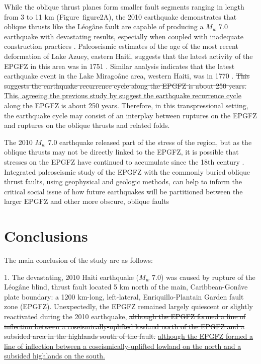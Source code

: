 \documentclass[linenumbers,draft]{agujournal}
\providecommand{\DIFadd}[1]{{\protect\color{blue}\uwave{#1}}} %
\providecommand{\DIFdel}[1]{{\protect\color{red}\sout{#1}}}                      %
\providecommand{\DIFaddbegin}{} %
\providecommand{\DIFaddend}{} %
\providecommand{\DIFdelbegin}{} %
\providecommand{\DIFdelend}{} %
\begin{document}
While the oblique thrust planes form smaller fault segments ranging in length from 3 to 11 km (Figure~{figure2}A), the 2010 earthquake demonstrates that oblique thrusts like the L\'eog\^ane fault are capable of producing a $M_w$ 7.0 earthquake with devastating results, especially when coupled with inadequate construction practices \citep{symithe2016present}. Paleoseismic estimates of the age of the most recent deformation of Lake Azuey, eastern Haiti, suggests that the latest activity of the EPGFZ in this area was in 1751 \citep{prentice2010seismic,bakun2012significant}. Similar analysis indicates that the latest earthquake event in the Lake Mirago\^ane area, western Haiti, was in 1770 \citep{bakun2012significant}. \DIFdelbegin \DIFdel{This suggests the earthquake recurrence cycle along the EPGFZ is about 250 years. }\DIFdelend \DIFaddbegin \ul{This, agreeing the previous study by }\underline{\DIFadd{\mbox{%
\citet{bakun2012significant}}\hspace{0pt}%
,}}\ul{ suggest the earthquake recurrence cycle along the EPGFZ is about 250 years.} \DIFaddend Therefore, in this transpressional setting, the earthquake cycle may consist of an interplay between ruptures on the EPGFZ and ruptures on the oblique thrusts and related folds. 

The 2010 $M_w$ 7.0 earthquake released part of the stress of the region, but as the oblique thrusts may not be directly linked to the EPGFZ, it is possible that stresses on the EPGFZ have continued to accumulate since the 18th century \citep{prentice2010seismic}. Integrated paleoseismic study of the EPGFZ with the commonly buried oblique thrust faults, using geophysical and geologic methods, can help to inform the critical social issue of how future earthquakes will be partitioned between the larger EPGFZ and other more obscure, oblique faults

\section{Conclusions}
The main conclusion of the study are as follows: 

1. The devastating, 2010 Haiti earthquake ($M_w$ 7.0) was caused by rupture of the L\'eog\^ane blind, thrust fault located 5 km north of the main, Caribbean-Gon\^ave plate boundary: a 1200 km-long, left-lateral, Enriquillo-Plantain Garden fault zone (EPGFZ). Unexpectedly, the EPGFZ remained largely quiescent or slightly reactivated during the 2010 earthquake, \DIFdelbegin \DIFdel{although the EPGFZ formed a line of inflection between a coseismically-uplifted lowland north of the EPGFZ and a subsided area in the highlands south of the fault. 
}\DIFdelend \DIFaddbegin \ul{although the EPGFZ formed a line of inflection between a coseismically-uplifted lowland on the north and a subsided highlands on the south.} 
\DIFaddend 
\end{document}

